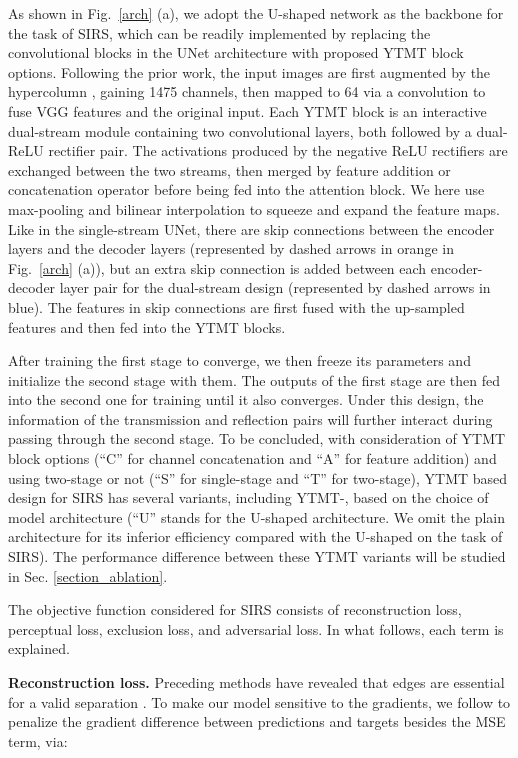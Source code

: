 \documentclass{article}
\begin{document}
As shown in Fig.~\ref{arch} (a), we adopt the U-shaped network as the backbone for the task of SIRS, which can be readily implemented by replacing the convolutional blocks in the UNet architecture with proposed YTMT block options.  Following the prior work, the input images are first augmented by the hypercolumn \cite{DBLP:conf/cvpr/ZhangNC18a}, gaining 1475 channels, then mapped to 64 via a  convolution to fuse VGG features and the original input. Each YTMT block is an interactive dual-stream module containing two convolutional layers, both followed by a dual-ReLU rectifier pair. The activations produced by the negative ReLU rectifiers are exchanged between the two streams, then merged by feature addition or concatenation operator before being fed into the attention block. We here use max-pooling and bilinear interpolation to squeeze and expand the feature maps.  Like in the single-stream UNet, there are skip connections between the encoder layers and the decoder layers (represented by dashed arrows in orange in Fig.~\ref{arch} (a)), but an extra skip connection is added between each encoder-decoder layer pair for the dual-stream design (represented by dashed arrows in blue). The features in skip connections are first fused with the up-sampled features and then fed into the YTMT blocks.

After training the first stage to converge, we then freeze its parameters and initialize the second stage with them. The outputs of the first stage are then fed into the second one for training until it also converges. Under this design, the information of the transmission and reflection pairs will further interact during passing through the second stage. To be concluded, with consideration of YTMT block options (``C'' for channel concatenation and ``A'' for feature addition) and using two-stage or not (``S'' for single-stage and ``T'' for two-stage), YTMT based design for SIRS has several variants, including YTMT-, based on the choice of model architecture (``U'' stands for the U-shaped architecture. We omit the plain architecture for its inferior efficiency compared with the U-shaped on the task of SIRS). The performance difference between these YTMT variants will be studied in Sec. \ref{section_ablation}.

The objective function considered for SIRS consists of reconstruction loss, perceptual loss, exclusion loss, and adversarial loss. In what follows, each term is explained. 

\par \noindent \textbf{Reconstruction loss.} Preceding methods have revealed that edges are essential for a valid separation \cite{DBLP:journals/pami/LevinW07,DBLP:journals/tog/Freeman15,DBLP:conf/iccv/FanYHCW17,DBLP:conf/cvpr/WanSDTK18}. To make our model sensitive to the gradients, we follow \cite{DBLP:conf/iccv/FanYHCW17, DBLP:conf/cvpr/WeiYFW019} to penalize the gradient difference between predictions and targets besides the MSE term, via: 
\end{document}
